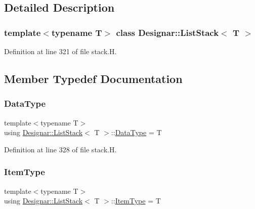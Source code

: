 \subsection{Detailed Description}
\subsubsection*{template$<$typename T$>$\newline
class Designar\+::\+List\+Stack$<$ T $>$}



Definition at line 321 of file stack.\+H.



\subsection{Member Typedef Documentation}
\mbox{\label{class_designar_1_1_list_stack_a9bdd8f2e28bca0397b835faa08a1d0dc}} 
\subsubsection{\texorpdfstring{Data\+Type}{DataType}}
{\footnotesize\ttfamily template$<$typename T$>$ \\
using \hyperlink{class_designar_1_1_list_stack}{Designar\+::\+List\+Stack}$<$ T $>$\+::\hyperlink{class_designar_1_1_s_l_list_aa98659227d90b392a1b52fa5e9b292f4}{Data\+Type} =  T}



Definition at line 328 of file stack.\+H.

\mbox{\label{class_designar_1_1_list_stack_a5a584752d4cfca9e791071f1553d7c69}} 
\subsubsection{\texorpdfstring{Item\+Type}{ItemType}}
{\footnotesize\ttfamily template$<$typename T$>$ \\
using \hyperlink{class_designar_1_1_list_stack}{Designar\+::\+List\+Stack}$<$ T $>$\+::\hyperlink{class_designar_1_1_s_l_list_a8ec47bfb6b0d74c8f85111b7b3c05cb2}{Item\+Type} =  T}



